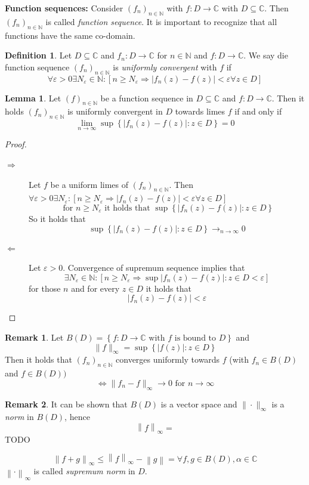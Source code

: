 \documentclass[a4paper,landscape,twocolumn]{article}
\theoremstyle{definition}
\newtheorem{defi}{Definition}
\newtheorem{rem}{Remark}
\newtheorem{lemma}{Lemma}
\newcommand\set[1]{\left\{#1\right\}}
\newcommand\abs[1]{\left|#1\right|}
\newcommand\seq[1]{{\left(#1\right)}_{n \in \mathbb N}}
\newcommand\norm[1]{\left\|#1\right\|}
\begin{document}
\textbf{Function sequences:}
Consider $\seq{f_n}$ with $f: D \to \mathbb C$ with $D \subseteq \mathbb C$.
Then $\seq{f_n}$ is called \emph{function sequence}. It is important to recognize
that all functions have the same co-domain.

\begin{defi}
  Let $D \subseteq \mathbb C$ and $f_n: D \to \mathbb C$ for $n \in \mathbb N$ and
  $f: D \to \mathbb C$. We say die function sequence $\seq{f_n}$ is
  \emph{uniformly convergent} with $f$ if
  \[
    \forall \varepsilon > 0 \exists N_\varepsilon \in \mathbb N:
    \left[n \geq N_\varepsilon \Rightarrow \abs{f_n(z) - f(z)} < \varepsilon \forall z \in D\right]
  \]
\end{defi}

\begin{lemma}
  Let $\seq{f}$ be a function sequence in $D \subseteq \mathbb C$ and $f: D \to \mathbb C$.
  Then it holds $\seq{f_n}$ is uniformly convergent in $D$ towards limes $f$ if and only if
  \[ \lim_{n\to\infty} \sup\set{\abs{f_n(z) - f(z)}: z \in D} = 0 \]
\end{lemma}
\begin{proof}
  \begin{description}
    \item[$\Rightarrow$]
      Let $f$ be a uniform limes of $\seq{f_n}$. Then $\forall \varepsilon > 0
      \exists N_\varepsilon: [n \geq N_\varepsilon \Rightarrow \abs{f_n(z) - f(z)} < \varepsilon
      \forall z \in D]$
      \[
        \text{ for } n \geq N_\varepsilon \text{ it holds that }
        \sup\set{\abs{f_n(z) - f(z)}: z \in D}
      \]
      So it holds that
      \[ \sup\set{\abs{f_n(z) - f(z)}: z \in D} \to_{n\to\infty} 0 \]
    \item[$\Leftarrow$]
      Let $\varepsilon > 0$. Convergence of supremum sequence implies that
      \[
        \exists N_\varepsilon \in \mathbb N:
        [n \geq N_\varepsilon \Rightarrow \sup{\abs{f_n(z) - f(z)}: z \in D} < \varepsilon]
      \]
      for those $n$ and for every $z \in D$ it holds that
      \[ \abs{f_n(z) - f(z)} < \varepsilon \]
  \end{description}
\end{proof}
\begin{rem}
  Let $B(D) = \set{f: D \to \mathbb C \text{ with } f \text{ is bound to } D}$ and
  \[ \| f \|_\infty = \sup\set{\abs{f(z)}: z \in D} \]
  Then it holds that $\seq{f_n}$ converges uniformly towards $f$
  (with $f_n \in B(D)$ and $f \in B(D))$
  \[ \Leftrightarrow \| f_n - f \|_\infty \to 0 \text{ for } n \to \infty \]
\end{rem}
\begin{rem}
  It can be shown that $B(D)$ is a vector space and $\|\cdot \|_\infty$ is a \emph{norm}
  in $B(D)$, hence
  \[ \norm{f}_\infty =  \]
  TODO

  \[ \norm{f+g}_\infty \leq \norm{f}_\infty - \norm{g} = \forall f,g \in B(D), \alpha \in \mathbb C \]
  $\norm{\cdot}_\infty$ is called \emph{supremum norm} in $D$.
\end{rem}
\end{document}
